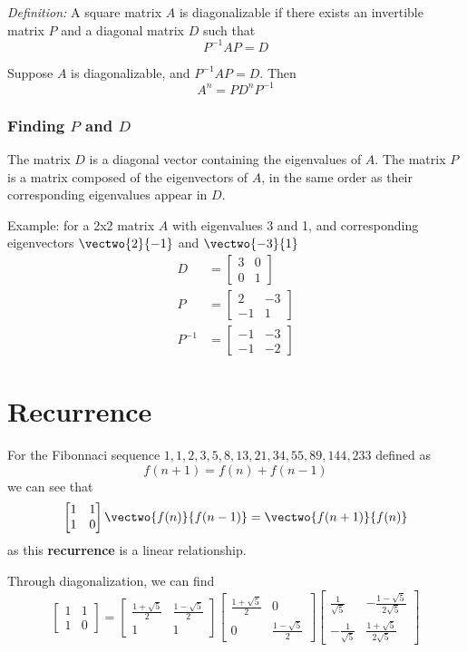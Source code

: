 \documentclass[12pt]{article}
\begin{document}
\textit{Definition:} A square matrix $A$ is diagonalizable if there exists an invertible matrix $P$ and a diagonal matrix $D$ such that \[ P^{-1}AP = D \]

Suppose $A$ is diagonalizable, and $P^{-1}AP = D$. Then \[ A^n = PD^nP^{-1} \]

\subsubsection*{Finding $P$ and $D$}
The matrix $D$ is a diagonal vector containing the eigenvalues of $A$. The matrix $P$ is a matrix composed of the eigenvectors of $A$, in the same order as their corresponding eigenvalues appear in $D$.

Example: for a 2x2 matrix $A$ with eigenvalues 3 and 1, and corresponding eigenvectors $\vectwo{2}{-1}$ and $\vectwo{-3}{1}$
\begin{align*}
D &= \begin{bmatrix}3&0\\0&1\end{bmatrix}\\
P &= \begin{bmatrix}2&-3\\-1&1\end{bmatrix}\\
P^{-1} &= \begin{bmatrix}-1&-3\\-1&-2\end{bmatrix}
\end{align*}

\section*{Recurrence}
For the Fibonnaci sequence $1, 1, 2, 3, 5, 8, 13, 21, 34, 55, 89, 144, 233$ defined as \[ f(n+1) = f(n) + f(n-1) \] we can see that  \[ \begin{bmatrix}1&1\\1&0\end{bmatrix}\vectwo{f(n)}{f(n-1)} = \vectwo{f(n+1)}{f(n)} \] as this {\bf recurrence} is a linear relationship.

Through diagonalization, we can find \[ \begin{bmatrix}1&1\\1&0\end{bmatrix} = \begin{bmatrix}\frac{1+\sqrt{5}}{2}&\frac{1-\sqrt{5}}{2}\\1&1\end{bmatrix}\begin{bmatrix}\frac{1+\sqrt{5}}{2}&0\\0&\frac{1-\sqrt{5}}{2}\end{bmatrix}\begin{bmatrix}\frac{1}{\sqrt{5}}&-\frac{1-\sqrt{5}}{2\sqrt{5}}\\-\frac{1}{\sqrt{5}}&\frac{1+\sqrt{5}}{2\sqrt{5}}\end{bmatrix} \]
\end{document}

